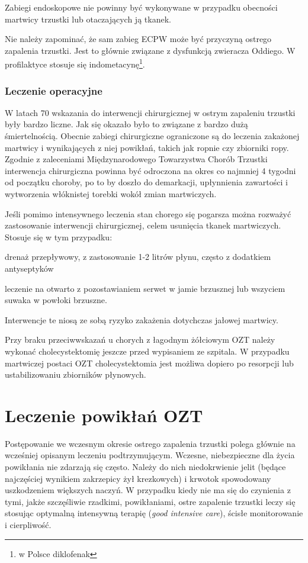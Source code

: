 \documentclass[a4paper, 12pt]{report}
\begin{document}
Zabiegi endoskopowe nie powinny być wykonywane w przypadku obecności
martwicy trzustki lub otaczających ją tkanek.

Nie należy zapominać, że sam zabieg ECPW może być przyczyną ostrego
zapalenia trzustki. Jest to głównie związane z dysfunkcją zwieracza
Oddiego. W profilaktyce stosuje się indometacynę\footnote{w Polsce diklofenak}.

\subsubsection{Leczenie operacyjne}

W latach 70 wskazania do interwencji chirurgicznej w ostrym zapaleniu
trzustki były bardzo liczne. Jak się okazało było to związane z bardzo
dużą śmiertelnością. Obecnie zabiegi chirurgiczne ograniczone są do
leczenia zakażonej martwicy i wynikających z niej powikłań, takich jak
ropnie czy zbiorniki ropy. Zgodnie z zaleceniami Międzynarodowego
Towarzystwa Chorób Trzustki interwencja chirurgiczna powinna być
odroczona na okres co najmniej 4 tygodni od początku choroby, po to by
doszło do demarkacji, upłynnienia zawartości i wytworzenia włóknistej
torebki wokół zmian martwiczych.

Jeśli pomimo intensywnego leczenia stan chorego się pogarsza można
rozważyć zastosowanie interwencji chirurgicznej, celem usunięcia
tkanek martwiczych. Stosuje się w tym przypadku:
\begin{inparaenum}
\item drenaż przepływowy, z zastosowanie 1-2 litrów płynu, często z
  dodatkiem antyseptyków
\item leczenie na otwarto z pozostawianiem serwet w jamie brzusznej
  lub wszyciem suwaka w powłoki brzuszne.
\end{inparaenum}
Interwencje te niosą ze sobą ryzyko zakażenia dotychczas jałowej
martwicy.

Przy braku przeciwwskazań u chorych z łagodnym żółciowym OZT należy
wykonać cholecystektomię jeszcze przed wypisaniem ze szpitala. W
przypadku martwiczej postaci OZT cholecystektomia jest możliwa dopiero
po resorpcji lub ustabilizowaniu zbiorników płynowych.

\section{Leczenie powikłań OZT}

Postępowanie we wczesnym okresie ostrego zapalenia trzustki polega
głównie na wcześniej opisanym leczeniu podtrzymującym. Wczesne,
niebezpieczne dla życia powikłania nie zdarzają się często. Należy do
nich niedokrwienie jelit (będące najczęściej wynikiem zakrzepicy żył
krezkowych) i krwotok spowodowany uszkodzeniem większych naczyń. W
przypadku kiedy nie ma się do czynienia z tymi, jakże szczęśliwie
rzadkimi, powikłaniami, ostre zapalenie trzustki leczy się stosując
optymalną intensywną terapię (\textsl{good intensive care}), ścisłe
monitorowanie i cierpliwość.
\end{document}

